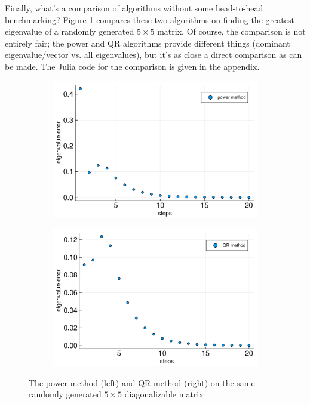 \documentclass{article}
\begin{document}
Finally, what's a comparison of algorithms without some head-to-head benchmarking? Figure \ref{fig-cmp} compares these two algorithms on finding the greatest eigenvalue of a randomly generated $5 \times 5$ matrix. Of course, the comparison is not entirely fair; the power and QR algorithms provide different things (dominant eigenvalue/vector vs. all eigenvalues), but it's as close a direct comparison as can be made. The Julia code for the comparison is given in the appendix.

\begin{figure}[H]
  \centering
  \begin{subfigure}{.49\textwidth}
    \centering
    \includegraphics[width=\textwidth]{power-cmp.pdf}
  \end{subfigure}
  \begin{subfigure}{.49\textwidth}
    \centering
    \includegraphics[width=\textwidth]{qr-cmp.pdf}
  \end{subfigure}
  \caption{The power method (left) and QR method (right) on the same randomly generated $5 \times 5$ diagonalizable matrix}
  \label{fig-cmp}
\end{figure}
\end{document}
